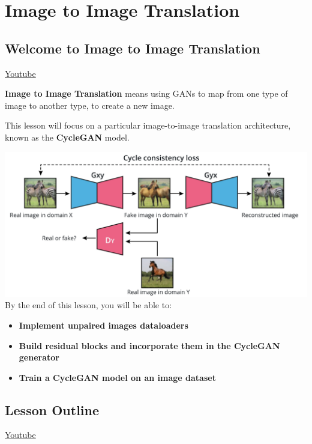 \chapter{Image to Image Translation}

\section{Welcome to Image to Image Translation}
\href{https://www.youtube.com/watch?v=vR2J4Z6zPlE&t=6s}{Youtube} \newline

\textbf{Image to Image Translation} means using GANs to map from one type of image to another type, to create a new image. \newline

This lesson will focus on a particular image-to-image translation architecture, known as the \textbf{CycleGAN} model.

\includegraphics[width=1\linewidth]{img//genAdvNet//image2image/screen-shot-2022-05-11-at-4.59.11-pm.jpeg}
By the end of this lesson, you will be able to:

\begin{itemize}
    \item \textbf{Implement unpaired images dataloaders}
    \item \textbf{Build residual blocks and incorporate them in the CycleGAN generator}
    \item \textbf{Train a CycleGAN model on an image dataset}
\end{itemize}

\section{Lesson Outline}
\href{https://www.youtube.com/watch?v=7a6fILYRBUo}{Youtube} \newline


